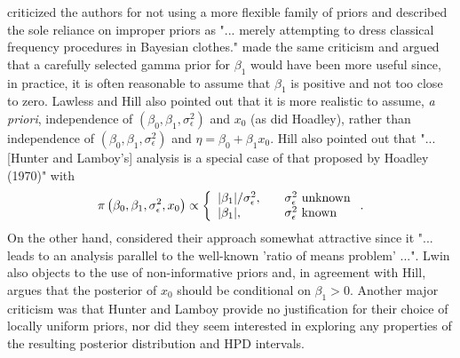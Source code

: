 \documentclass[cmfont,usenames,dvipsnames,leqno]{afit-etd}\usepackage[]{graphicx}\usepackage[]{color}
\begin{document}
\citet{lawless_discussion_1981} criticized the authors for not using a more flexible family of priors and described the sole reliance on improper priors as "... merely attempting to dress classical frequency procedures in Bayesian clothes." \citet{hill_discussion_1981} made the same criticism and argued that a carefully selected gamma prior for $\beta_1$ would have been more useful since, in practice, it is often reasonable to assume that $\beta_1$ is positive and not too close to zero. Lawless and Hill also pointed out that it is more realistic to assume, \textit{a priori}, independence of $(\beta_0, \beta_1, \sigma_\epsilon^2)$ and $x_0$ (as did Hoadley), rather than 
independence of $(\beta_0, \beta_1, \sigma_\epsilon^2)$ and $\eta = \beta_0 + \beta_1 x_0$. Hill also pointed out that "... [Hunter and Lamboy's] analysis is a special case of that proposed by Hoadley (1970)" with 
\begin{equation*}
  \pi\left(\beta_0, \beta_1, \sigma_\epsilon^2, x_0\right) \propto \left\{ \begin{array}{l l}
                                                         |\beta_1|/\sigma_\epsilon^2, & \quad \text{$\sigma_\epsilon^2$ unknown} \\
                                                         |\beta_1|,          & \quad \text{$\sigma_\epsilon^2$ known}
                                                       \end{array} \right..
\end{equation*}
On the other hand, \citet{lwin_discussion_1981} considered their approach somewhat attractive since it "... leads to an analysis parallel to the well-known 'ratio of means problem' ...". Lwin also objects to the use of non-informative priors and, in agreement with Hill, argues that the posterior of $x_0$ should be conditional on $\beta_1 > 0$. Another major criticism was that Hunter and Lamboy provide no justification for their choice of locally uniform priors, nor did they seem interested in exploring any properties of the resulting posterior distribution and HPD intervals. 
\end{document}
